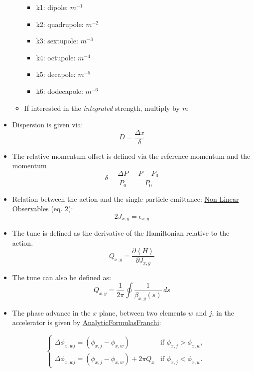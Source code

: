 \documentclass[12pt,a4,]{article}
\numberwithin{equation}{subsection}
\providecommand{\tightlist}{%
  \setlength{\itemsep}{0pt}\setlength{\parskip}{0pt}}
\begin{document}
\begin{itemize}
\begin{itemize}
    \begin{itemize}
    \tightlist
    \item
      k1: dipole: \(m^{-1}\)
    \item
      k2: quadrupole: \(m^{-2}\)
    \item
      k3: sextupole: \(m^{-3}\)
    \item
      k4: octupole: \(m^{-4}\)
    \item
      k5: decapole: \(m^{-5}\)
    \item
      k6: dodecapole: \(m^{-6}\)
    \end{itemize}
  \item
    If interested in the \emph{integrated} strength, multiply by
    \emph{m}
  \end{itemize}
\item
  Dispersion is given via:
  \begin{equation}D = \frac{\Delta x}{\delta}\end{equation}
\item
  The relative momentum offset is defined via the reference momentum and
  the momentum
  \begin{equation}\delta = \frac{\Delta P}{P_0} = \frac{P - P_0}{P_0}\label{eq:dpp}\end{equation}
\item
  Relation between the action and the single particle emittance:
  \href{https://journals.aps.org/prab/pdf/10.1103/PhysRevSTAB.17.081002}{Non
  Linear Observables} (eq. 2):
  \begin{equation}2J_{x,y} = \epsilon_{x,y}\end{equation}
\item
  The tune is defined as the derivative of the Hamiltonian relative to
  the action.
  \begin{equation}Q_{x,y} = \frac{\partial \left< H \right>}{\partial J_{x,y}}\end{equation}
\item
  The tune can also be defined as:
  \begin{equation}Q_{x,y} = \frac{1}{2 \pi} \oint \frac{1}{\beta_{x,y}(s)} \,ds\end{equation}
\item
  The phase advance in the \(x\) plane, between two elements \(w\) and
  \(j\), in the accelerator is given by
  \href{https://arxiv.org/abs/1711.06589}{AnalyticFormulasFranchi}:
\end{itemize}

\begin{equation}
\begin{cases} 
  \Delta \phi_{x,wj} = \left(\phi_{x,j} - \phi_{x,w} \right)              & \mbox{if } \phi_{x,j} > \phi_{x,w}, \\
  \Delta \phi_{x,wj} = \left(\phi_{x,j} - \phi_{x,w} \right) + 2 \pi Q_x  & \mbox{if } \phi_{x,j} < \phi_{x,w}.
\end{cases}
\end{equation}
\end{document}
